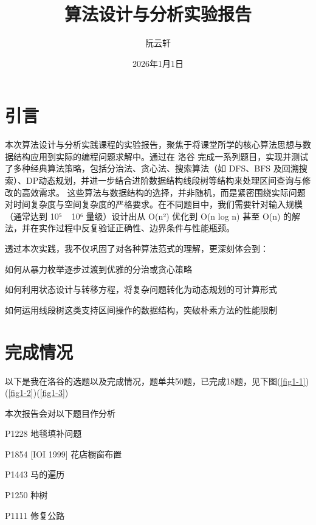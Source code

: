 \documentclass[supercite]{Experimental_Report}
\title{算法设计与分析实验报告}
\author{阮云轩}
\date{2026年1月1日}
\theoremstyle{definition}
\begin{document}
	
	\maketitle
	
	\clearpage
	
	
	\tableofcontents[level=2]
	
	\clearpage
	
	
	\listoflistings
	
	\section{引言}
	本次算法设计与分析实践课程的实验报告，聚焦于将课堂所学的核心算法思想与数据结构应用到实际的编程问题求解中。通过在 洛谷 完成一系列题目，实现并测试了多种经典算法策略，包括分治法、贪心法、搜索算法（如 DFS、BFS 及回溯搜索）、DP动态规划，并进一步结合进阶数据结构线段树等结构来处理区间查询与修改的高效需求。
	这些算法与数据结构的选择，并非随机，而是紧密围绕实际问题对时间复杂度与空间复杂度的严格要求。在不同题目中，我们需要针对输入规模（通常达到 10⁵ ~ 10⁶ 量级）设计出从 O(n²) 优化到 O(n log n) 甚至 O(n) 的解法，并在实作过程中反复验证正确性、边界条件与性能瓶颈。
	
	透过本次实践，我不仅巩固了对各种算法范式的理解，更深刻体会到：
	
	如何从暴力枚举逐步过渡到优雅的分治或贪心策略
	
	如何利用状态设计与转移方程，将复杂问题转化为动态规划的可计算形式
	
	如何运用线段树这类支持区间操作的数据结构，突破朴素方法的性能限制
	
	
	\section{完成情况}
	以下是我在洛谷的选题以及完成情况，题单共50题，已完成18题，见下图(\ref{fig1-1})(\ref{fig1-2})(\ref{fig1-3})
	
	本次报告会对以下题目作分析
	
	P1228 地毯填补问题
	
	P1854 [IOI 1999] 花店橱窗布置
	
	P1443 马的遍历
	
	P1250 种树
	
	P1111 修复公路
	
\end{document}
